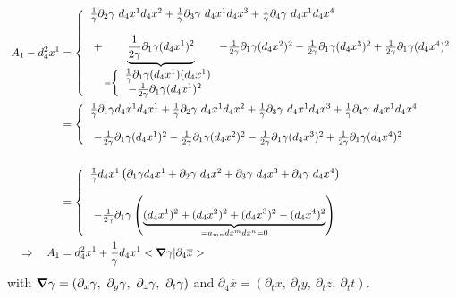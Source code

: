 \begin{align}
\ A_1 -d^2_4x^1 &= \left \{ \begin{array}{l}\frac{1}{\gamma}  \partial_2 \gamma \ d_4x^1d_4x^2  + \frac{1}{\gamma}  \partial_3 \gamma \ d_4x^1 d_4x^3+\frac{1}{\gamma}  \partial_4 \gamma \ d_4x^1 d_4x^4\\\\
\ + \underbrace{\frac{1}{2\gamma}\partial_1 \gamma (d_4x^1)^2}_{= \left \{ \begin{array}{l} \frac{1}{\gamma} \partial_1 \gamma (d_4x^1) (d_4x^1)\\
\  - \frac{1}{2\gamma} \partial_1 \gamma (d_4x^1)^2 \end{array} \right.} - \frac{1}{2\gamma}\partial_1 \gamma (d_4x^2)^2- \frac{1}{2\gamma}\partial_1 \gamma (d_4x^3)^2+ \frac{1}{2\gamma}\partial_1 \gamma (d_4x^4)^2
 \end{array} \right.\\
 &= \left \{ \begin{array}{l}\frac{1}{\gamma} \partial_1 \gamma d_4x^1 d_4x^1 + \frac{1}{\gamma}  \partial_2 \gamma \ d_4x^1d_4x^2  + \frac{1}{\gamma}  \partial_3 \gamma \ d_4x^1 d_4x^3+\frac{1}{\gamma}  \partial_4 \gamma \ d_4x^1 d_4x^4\\\\
\ - \frac{1}{2\gamma}\partial_1 \gamma (d_4x^1)^2 - \frac{1}{2\gamma}\partial_1 \gamma (d_4x^2)^2- \frac{1}{2\gamma}\partial_1 \gamma (d_4x^3)^2+ \frac{1}{2\gamma}\partial_1 \gamma (d_4x^4)^2
 \end{array} \right.\\\\
  &= \left \{ \begin{array}{l}\frac{1}{\gamma}d_4x^1 \left(\partial_1 \gamma  d_4x^1  + \partial_2 \gamma \ d_4x^2  + \partial_3 \gamma \  d_4x^3+ \partial_4 \gamma \ d_4x^4 \right)\\\\
\ - \frac{1}{2\gamma}\partial_1 \gamma \left(\underbrace{(d_4x^1)^2 +(d_4x^2)^2+(d_4x^3)^2- (d_4x^4)^2}_{= a_{mn}dx^m dx^n = 0 }\right)
 \end{array} \right.\\
 \Rightarrow \quad A_1 &= d^2_4x^1+ \frac{1}{\gamma}d_4x^1 < \grad \gamma|\partial_4 \overline{x} >
\end{align}
with $\grad \gamma =  (\partial_x \gamma,\ \partial_y \gamma, \ \partial_z \gamma, \ \partial_t \gamma)$ and $ \partial_4 \overline{x} =  (\partial_t x, \ \partial_t y , \ \partial_t z, \ \partial_t t)$.\\
